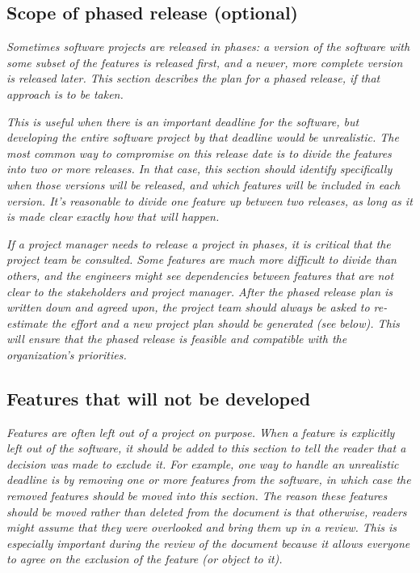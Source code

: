 \documentclass[12pt]{article}
\begin{document}
\subsection{Scope of phased release (optional)}

    \textit{Sometimes software projects are released in phases: a version of
    the software with some subset of the features is released first,
    and a newer, more complete version is released later. This section
    describes the plan for a phased release, if that approach is to be
    taken.}

    \textit{This is useful when there is an important deadline for the
    software, but developing the entire software project by that
    deadline would be unrealistic. The most common way to compromise
    on this release date is to divide the features into two or more
    releases. In that case, this section should identify specifically
    when those versions will be released, and which features will be
    included in each version. It's reasonable to divide one feature up
    between two releases, as long as it is made clear exactly how that
    will happen.}

    \textit{If a project manager needs to release a project in phases, it is
    critical that the project team be consulted. Some features are
    much more difficult to divide than others, and the engineers might
    see dependencies between features that are not clear to the
    stakeholders and project manager. After the phased release plan is
    written down and agreed upon, the project team should always be
    asked to re-estimate the effort and a new project plan should be
    generated (see below). This will ensure that the phased release is
    feasible and compatible with the organization's priorities.}

\subsection{Features that will not be developed}

    \textit{Features are often left out of a project on purpose. When a
    feature is explicitly left out of the software, it should be added
    to this section to tell the reader that a decision was made to
    exclude it. For example, one way to handle an unrealistic deadline
    is by removing one or more features from the software, in which
    case the removed features should be moved into this section. The
    reason these features should be moved rather than deleted from the
    document is that otherwise, readers might assume that they were
    overlooked and bring them up in a review. This is especially
    important during the review of the document because it allows
    everyone to agree on the exclusion of the feature (or object to
    it).}
\end{document}
